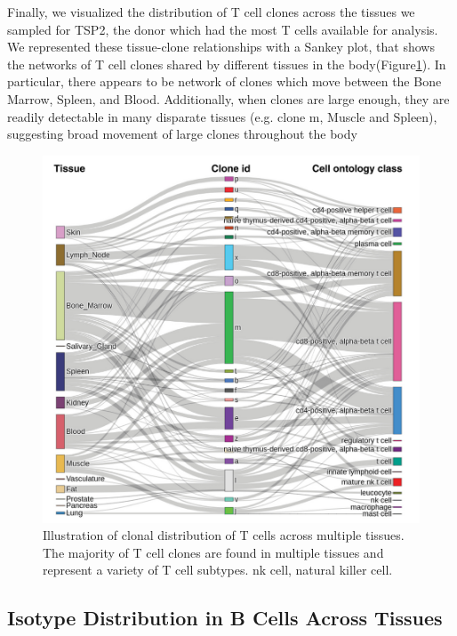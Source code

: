 Finally, we visualized the distribution of T cell clones across the tissues we sampled for TSP2, the donor which had the most T cells available for analysis. We represented these tissue-clone relationships with a Sankey plot, that shows the networks of T cell clones shared by different tissues in the body(Figure\ref{fig:TabulaSapiens_sankey}). In particular, there appears to be network of clones which move between the Bone Marrow, Spleen, and Blood. Additionally, when clones are large enough, they are readily detectable in many disparate tissues (e.g. clone m, Muscle and Spleen), suggesting broad movement of large clones throughout the body    
\begin{figure}[hbt!]
\centering
\includegraphics[width=14cm, keepaspectratio]{figs/TabulaSapiens/fig4_sankey.png}
\caption[Sankey Plot of T cell clones in Tabula Sapiens]{Illustration of clonal distribution of T cells across multiple tissues. The majority of T cell clones are found in multiple tissues and represent a variety of T cell subtypes. nk cell, natural killer cell.}
\label{fig:TabulaSapiens_sankey}
\end{figure}



\subsection{Isotype Distribution in B Cells Across Tissues}


